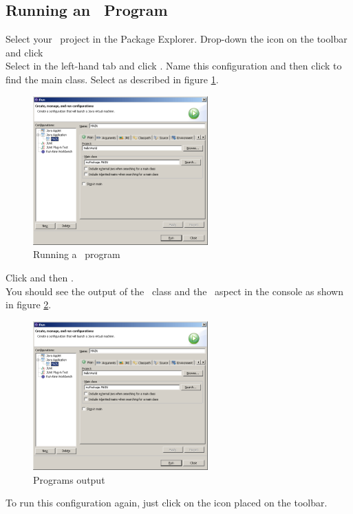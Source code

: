 \subsection{Running an \caesarj ~Program}
Select your \caesarj ~project in the Package Explorer. Drop-down the  icon on the toolbar and click \\
Select  in the left-hand tab and click .
Name this configuration  and then click  to find the main class. Select  as described in figure \ref{fig:run}.

\begin{figure}[htbp]
	\centering
		\includegraphics[width=0.60\textwidth]{images/run.png}
	\caption{Running a \caesarj ~program}
	\label{fig:run}
\end{figure}

Click  and then .\\
You should see the output of the  ~class and the  ~aspect in the console as shown in figure \ref{fig:console}.

\begin{figure}[htbp]
	\centering
		\includegraphics[width=0.60\textwidth]{images/run.png}
	\caption{Programs output}
	\label{fig:console}
\end{figure}
To run this configuration again, just click on the  icon placed on the toolbar.
